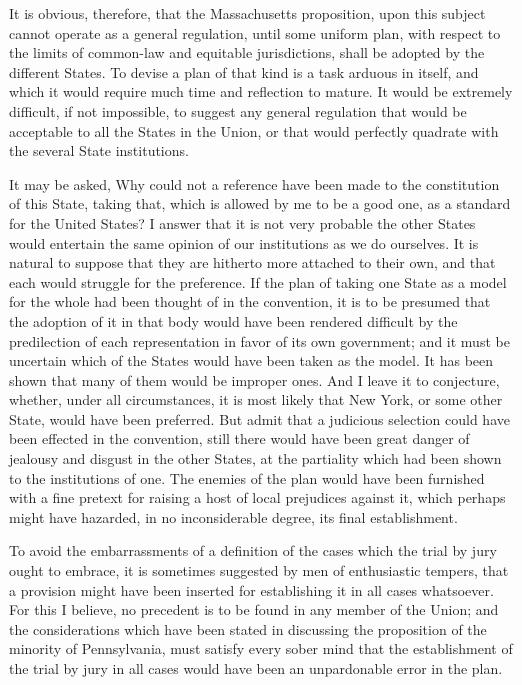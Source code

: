 It is obvious, therefore, that the Massachusetts proposition, upon this subject cannot operate as a general regulation, until some uniform plan, with respect to the limits of common-law and equitable jurisdictions, shall be adopted by the different States. 
To devise a plan of that kind is a task arduous in itself, and which it would require much time and reflection to mature. 
It would be extremely difficult, if not impossible, to suggest any general regulation that would be acceptable to all the States in the Union, or that would perfectly quadrate with the several State institutions.

It may be asked, Why could not a reference have been made to the constitution of this State, taking that, which is allowed by me to be a good one, as a standard for the United States? 
I answer that it is not very probable the other States would entertain the same opinion of our institutions as we do ourselves. 
It is natural to suppose that they are hitherto more attached to their own, and that each would struggle for the preference. 
If the plan of taking one State as a model for the whole had been thought of in the convention, it is to be presumed that the adoption of it in that body would have been rendered difficult by the predilection of each representation in favor of its own government; and it must be uncertain which of the States would have been taken as the model. 
It has been shown that many of them would be improper ones. 
And I leave it to conjecture, whether, under all circumstances, it is most likely that New York, or some other State, would have been preferred. 
But admit that a judicious selection could have been effected in the convention, still there would have been great danger of jealousy and disgust in the other States, at the partiality which had been shown to the institutions of one. 
The enemies of the plan would have been furnished with a fine pretext for raising a host of local prejudices against it, which perhaps might have hazarded, in no inconsiderable degree, its final establishment.

To avoid the embarrassments of a definition of the cases which the trial by jury ought to embrace, it is sometimes suggested by men of enthusiastic tempers, that a provision might have been inserted for establishing it in all cases whatsoever. 
For this I believe, no precedent is to be found in any member of the Union; and the considerations which have been stated in discussing the proposition of the minority of Pennsylvania, must satisfy every sober mind that the establishment of the trial by jury in all cases would have been an unpardonable error in the plan.

